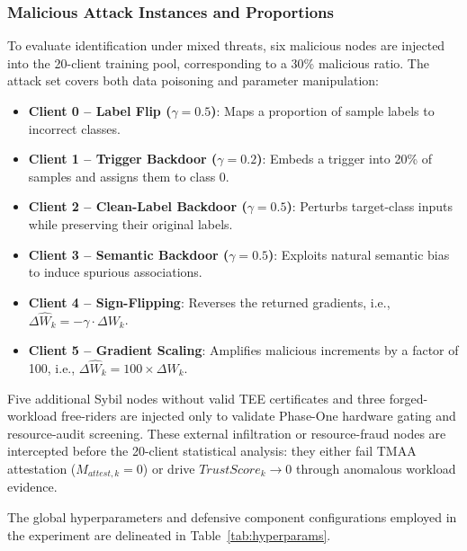 \documentclass[final,5p,times,twocolumn]{elsarticle/elsarticle}
\newenvironment{tightitemize}{%
  \begin{itemize}\setlength{\itemsep}{1pt}\setlength{\parskip}{0pt}\setlength{\parsep}{0pt}}{\end{itemize}}
\begin{document}
\subsubsection{Malicious Attack Instances and Proportions}
To evaluate identification under mixed threats, six malicious nodes are injected into the 20-client training pool, corresponding to a 30\% malicious ratio. The attack set covers both data poisoning and parameter manipulation:
\begin{tightitemize}
    \item \textbf{Client 0 -- Label Flip ($\gamma=0.5$)}: Maps a proportion of sample labels to incorrect classes.
    \item \textbf{Client 1 -- Trigger Backdoor ($\gamma=0.2$)}: Embeds a trigger into 20\% of samples and assigns them to class $0$.
    \item \textbf{Client 2 -- Clean-Label Backdoor ($\gamma=0.5$)}: Perturbs target-class inputs while preserving their original labels.
    \item \textbf{Client 3 -- Semantic Backdoor ($\gamma=0.5$)}: Exploits natural semantic bias to induce spurious associations.
    \item \textbf{Client 4 -- Sign-Flipping}: Reverses the returned gradients, i.e., $\Delta \widehat{W}_k=-\gamma \cdot \Delta W_k$.
    \item \textbf{Client 5 -- Gradient Scaling}: Amplifies malicious increments by a factor of 100, i.e., $\Delta \widehat{W}_k=100 \times \Delta W_k$.
\end{tightitemize}

Five additional Sybil nodes without valid TEE certificates and three forged-workload free-riders are injected only to validate Phase-One hardware gating and resource-audit screening. These external infiltration or resource-fraud nodes are intercepted before the 20-client statistical analysis: they either fail TMAA attestation ($M_{attest,k}=0$) or drive $TrustScore_k \to 0$ through anomalous workload evidence.

The global hyperparameters and defensive component configurations employed in the experiment are delineated in Table~\ref{tab:hyperparams}.
\end{document}
